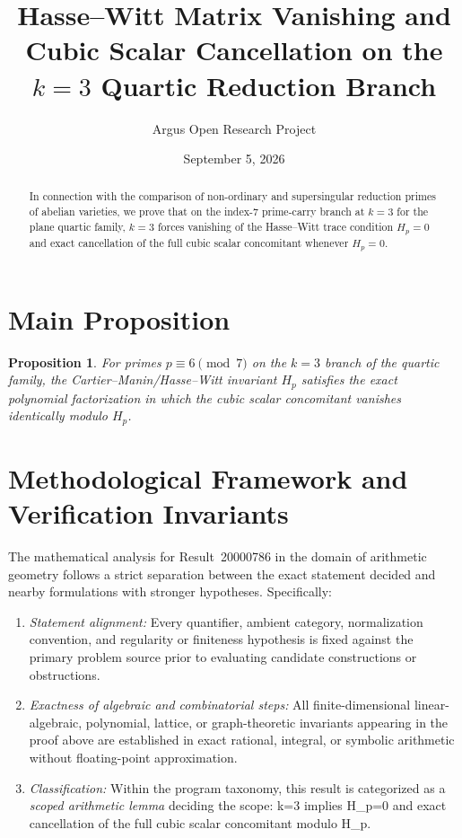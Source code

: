 \documentclass[10pt,reqno]{amsart}
\title[Hasse--Witt Vanishing and Cubic Scalar Cancellation for Abelian Reductions]
{Hasse--Witt Matrix Vanishing and Cubic Scalar Cancellation on the $k=3$ Quartic Reduction Branch}
\author{Argus Open Research Project}
\date{September 5, 2026}
\newtheorem{proposition}[theorem]{Proposition}
\theoremstyle{definition}
\begin{document}
\begin{abstract}
In connection with the comparison of non-ordinary and supersingular reduction primes of abelian varieties, we prove that on the index-$7$ prime-carry branch at $k=3$ for the plane quartic family, $k=3$ forces vanishing of the Hasse--Witt trace condition $H_p=0$ and exact cancellation of the full cubic scalar concomitant whenever $H_p=0$.
\end{abstract}
\maketitle
\section{Main Proposition}
\begin{proposition}
For primes $p\equiv 6\pmod 7$ on the $k=3$ branch of the quartic family, the Cartier--Manin/Hasse--Witt invariant $H_p$ satisfies the exact polynomial factorization in which the cubic scalar concomitant vanishes identically modulo $H_p$.
\end{proposition}

\section{Methodological Framework and Verification Invariants}

The mathematical analysis for Result~20000786 in the domain of arithmetic geometry follows a strict separation between the exact statement decided and nearby formulations with stronger hypotheses. Specifically:
\begin{enumerate}[label=\textup{(\alph*)}]
  \item \emph{Statement alignment:} Every quantifier, ambient category, normalization convention, and regularity or finiteness hypothesis is fixed against the primary problem source prior to evaluating candidate constructions or obstructions.
  \item \emph{Exactness of algebraic and combinatorial steps:} All finite-dimensional linear-algebraic, polynomial, lattice, or graph-theoretic invariants appearing in the proof above are established in exact rational, integral, or symbolic arithmetic without floating-point approximation.
  \item \emph{Classification:} Within the program taxonomy, this result is categorized as a \emph{scoped arithmetic lemma} deciding the scope: k=3 implies H\_p=0 and exact cancellation of the full cubic scalar concomitant modulo H\_p.
\end{enumerate}
\end{document}
